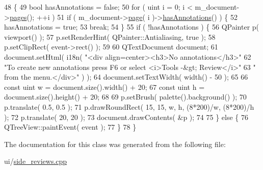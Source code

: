 \begin{DoxyCode}
48     \{
49       \textcolor{keywordtype}{bool} hasAnnotations = \textcolor{keyword}{false};
50       \textcolor{keywordflow}{for} ( uint i = 0; i < m\_document->\hyperlink{classOkular_1_1Document_aaf5d986758e25127946986abaa401bcd}{pages}(); ++i )
51         \textcolor{keywordflow}{if} ( m\_document->\hyperlink{classOkular_1_1Document_a1c95c2f192d739c217d00971da48f69d}{page}( i )->\hyperlink{classOkular_1_1Page_a7e7a1039febaed410867e5b3d30ef6c7}{hasAnnotations}() ) \{
52           hasAnnotations = \textcolor{keyword}{true};
53           \textcolor{keywordflow}{break};
54         \}
55       \textcolor{keywordflow}{if} ( !hasAnnotations ) \{
56         QPainter p( viewport() );
57         p.setRenderHint( QPainter::Antialiasing, \textcolor{keyword}{true} );
58         p.setClipRect( event->rect() );
59 
60         QTextDocument document;
61         document.setHtml( i18n( \textcolor{stringliteral}{"<div align=center><h3>No annotations</h3>"}
62                                 \textcolor{stringliteral}{"To create new annotations press F6 or select <i>Tools -&gt; Review</i>"}
63                                 \textcolor{stringliteral}{" from the menu.</div>"} ) );
64         document.setTextWidth( width() - 50 );
65 
66         \textcolor{keyword}{const} uint w = document.size().width() + 20;
67         \textcolor{keyword}{const} uint h = document.size().height() + 20;
68 
69         p.setBrush( palette().background() );
70         p.translate( 0.5, 0.5 );
71         p.drawRoundRect( 15, 15, w, h, (8*200)/w, (8*200)/h );
72         p.translate( 20, 20 );
73         document.drawContents( &p );
74 
75       \} \textcolor{keywordflow}{else} \{
76         QTreeView::paintEvent( event );
77       \}
78     \}
\end{DoxyCode}


The documentation for this class was generated from the following file\+:\begin{DoxyCompactItemize}
\item 
ui/\hyperlink{side__reviews_8cpp}{side\+\_\+reviews.\+cpp}\end{DoxyCompactItemize}

